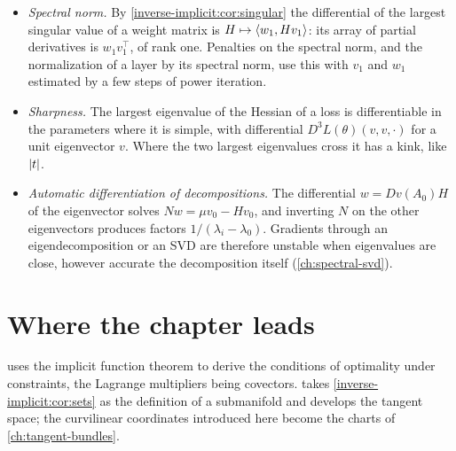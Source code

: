 \begin{notechapter}
\begin{mlthread}
\begin{itemize}[nosep]
  \item \emph{Spectral norm.} By
        \cref{inverse-implicit:cor:singular} the differential of the
        largest singular value of a weight matrix is
        $H\mapsto\left\langle w_1, Hv_1 \right\rangle$: its array of partial derivatives
        is $w_1v_1^\top$, of rank one. Penalties on the spectral norm,
        and the normalization of a layer by its spectral norm, use
        this with $v_1$ and $w_1$ estimated by a few steps of power
        iteration.
  \item \emph{Sharpness.} The largest eigenvalue of the Hessian of a
        loss is differentiable in the parameters where it is simple,
        with differential $D^3L(\theta)(v, v, \cdot)$ for a unit
        eigenvector $v$. Where the two largest eigenvalues cross it has
        a kink, like $\left|t\right|$.
  \item \emph{Automatic differentiation of decompositions.} The
        differential $w = Dv(A_0)H$ of the eigenvector solves
        $Nw = \mu v_0 - Hv_0$, and inverting $N$ on the other
        eigenvectors produces factors
        $1/(\lambda_i - \lambda_0)$. Gradients through an
        eigendecomposition or an SVD are therefore unstable when
        eigenvalues are close, however accurate the decomposition
        itself (\cref{ch:spectral-svd}).
\end{itemize}
\end{mlthread}

\section{Where the chapter leads}\label{inverse-implicit:sec:outlook}

 uses the implicit function theorem to
derive the conditions of optimality under constraints, the Lagrange
multipliers being covectors.  takes
\cref{inverse-implicit:cor:sets} as the definition of a submanifold and
develops the tangent space; the curvilinear coordinates introduced here
become the charts of \cref{ch:tangent-bundles}.


\end{notechapter}
